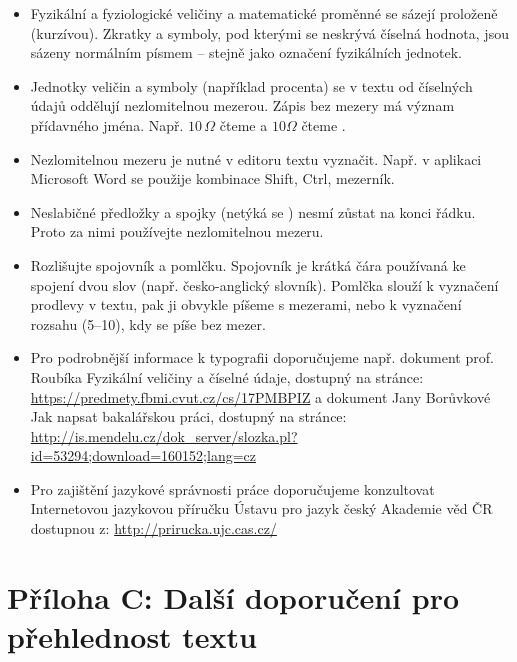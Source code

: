     \begin{itemize}
        \item Fyzikální a fyziologické veličiny a matematické proměnné se sázejí proloženě (kurzívou). Zkratky a symboly, pod kterými se neskrývá číselná hodnota, jsou sázeny normálním písmem – stejně jako označení fyzikálních jednotek.
        \item Jednotky veličin a symboly (například procenta) se v textu od číselných údajů oddělují nezlomitelnou mezerou. Zápis bez mezery má význam přídavného jména. Např. $10\,\Omega$ čteme  a $10\Omega$ čteme .
        \item Nezlomitelnou mezeru je nutné v editoru textu vyznačit. Např. v aplikaci Microsoft Word se použije kombinace Shift, Ctrl, mezerník. 
        \item Neslabičné předložky a spojky (netýká se ) nesmí zůstat na konci řádku. Proto za nimi používejte nezlomitelnou mezeru.
        \item Rozlišujte spojovník a pomlčku. Spojovník je krátká čára používaná ke spojení dvou slov (např. česko-anglický slovník). Pomlčka slouží k vyznačení prodlevy v textu, pak ji obvykle píšeme s mezerami, nebo k vyznačení rozsahu (5–10), kdy se píše bez mezer.
        \item Pro podrobnější informace k typografii doporučujeme např. dokument prof. Roubíka Fyzikální veličiny a číselné údaje, dostupný na stránce:
\url{https://predmety.fbmi.cvut.cz/cs/17PMBPIZ}
a dokument Jany Borůvkové Jak napsat bakalářskou práci, dostupný na stránce:
\url{http://is.mendelu.cz/dok_server/slozka.pl?id=53294;download=160152;lang=cz}
        \item Pro zajištění jazykové správnosti práce doporučujeme konzultovat Internetovou jazykovou příručku Ústavu pro jazyk český Akademie věd ČR dostupnou z: 
\url{http://prirucka.ujc.cas.cz/}
    \end{itemize}
    
\clearpage

\section*{Příloha C: Další doporučení pro přehlednost textu}
    \label{app:doporuceni}
    
